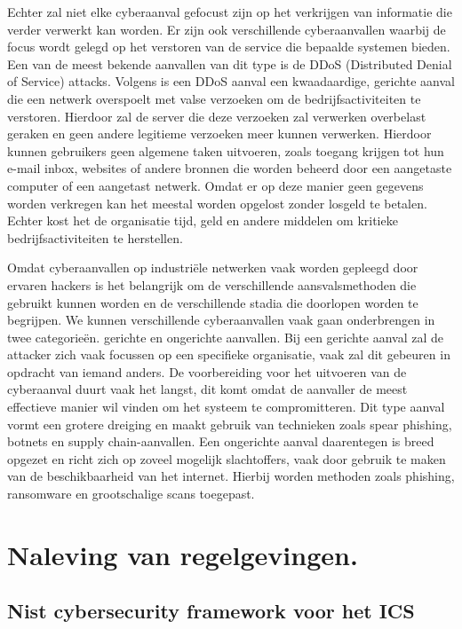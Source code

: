 Echter zal niet elke cyberaanval gefocust zijn op het verkrijgen van informatie die verder verwerkt kan worden. Er zijn ook verschillende cyberaanvallen waarbij de focus wordt gelegd op het verstoren van de service die bepaalde systemen bieden. Een van de meest bekende aanvallen van dit type is de DDoS (Distributed Denial of Service) attacks. Volgens \textcite{Baker2024} is een DDoS aanval een kwaadaardige, gerichte aanval die een netwerk overspoelt met valse verzoeken om de bedrijfsactiviteiten te verstoren. Hierdoor zal de server die deze verzoeken zal verwerken overbelast geraken en geen andere legitieme verzoeken meer kunnen verwerken. Hierdoor kunnen gebruikers geen algemene taken uitvoeren, zoals toegang krijgen tot hun e-mail inbox, websites of andere bronnen die worden beheerd door een aangetaste computer of een aangetast netwerk. Omdat er op deze manier geen gegevens worden verkregen kan het meestal worden opgelost zonder losgeld te betalen. Echter kost het de organisatie tijd, geld en andere middelen om kritieke bedrijfsactiviteiten te herstellen.

Omdat cyberaanvallen op industriële netwerken vaak worden gepleegd door ervaren hackers is het belangrijk om de verschillende aansvalsmethoden die gebruikt kunnen worden en de verschillende stadia die doorlopen worden te begrijpen. We kunnen verschillende cyberaanvallen vaak gaan onderbrengen in twee categorieën. gerichte en ongerichte aanvallen. Bij een gerichte aanval zal de attacker zich vaak focussen op een specifieke organisatie, vaak zal dit gebeuren in opdracht van iemand anders. De voorbereiding voor het uitvoeren van de cyberaanval duurt vaak het langst, dit komt omdat de aanvaller de meest effectieve manier wil vinden om het systeem te compromitteren. Dit type aanval vormt een grotere dreiging en maakt gebruik van technieken zoals spear phishing, botnets en supply chain-aanvallen. Een ongerichte aanval daarentegen is breed opgezet en richt zich op zoveel mogelijk slachtoffers, vaak door gebruik te maken van de beschikbaarheid van het internet. Hierbij worden methoden zoals phishing, ransomware en grootschalige scans toegepast. \autocite{biju2019}



\section{Naleving van regelgevingen.}
\subsection{Nist cybersecurity framework voor het ICS}

